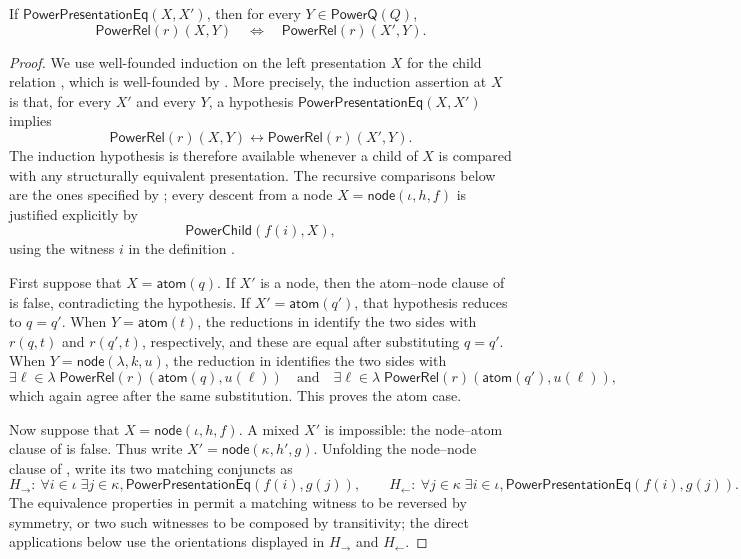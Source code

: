 \begin{lemma}
If $\mathsf{PowerPresentationEq}(X,X')$, then for every
$Y\in\mathsf{PowerQ}(Q)$,
\[
\mathsf{PowerRel}(r)(X,Y)\quad\Longleftrightarrow\quad
\mathsf{PowerRel}(r)(X',Y).
\]
\end{lemma}
\begin{proof}
We use well-founded induction on the left presentation $X$ for the child
relation , which is well-founded by
.  More precisely, the induction assertion at
$X$ is that, for every $X'$ and every $Y$, a hypothesis
$\mathsf{PowerPresentationEq}(X,X')$ implies
\[
 \mathsf{PowerRel}(r)(X,Y)\longleftrightarrow
 \mathsf{PowerRel}(r)(X',Y).
\]
The induction hypothesis is therefore available whenever a child of $X$ is
compared with any structurally equivalent presentation.  The recursive
comparisons below are the ones specified by ; every descent
from a node $X=\mathsf{node}(\iota,h,f)$ is justified explicitly by
\[
 \mathsf{PowerChild}(f(i),X),
\]
using the witness $i$ in the definition .

First suppose that $X=\mathsf{atom}(q)$.  If $X'$ is a node, then the
atom--node clause of  is false, contradicting
the hypothesis.  If $X'=\mathsf{atom}(q')$, that hypothesis reduces to
$q=q'$.  When $Y=\mathsf{atom}(t)$, the reductions in
 identify the two sides with $r(q,t)$ and
$r(q',t)$, respectively, and these are equal after substituting $q=q'$.
When $Y=\mathsf{node}(\lambda,k,u)$, the reduction in
 identifies the two sides with
\[
 \exists \ell\in\lambda\;\mathsf{PowerRel}(r)(\mathsf{atom}(q),u(\ell))
 \quad\text{and}\quad
 \exists \ell\in\lambda\;\mathsf{PowerRel}(r)(\mathsf{atom}(q'),u(\ell)),
\]
which again agree after the same substitution.  This proves the atom case.

Now suppose that $X=\mathsf{node}(\iota,h,f)$.  A mixed $X'$ is impossible:
the node--atom clause of  is false.  Thus write
$X'=\mathsf{node}(\kappa,h',g)$.  Unfolding the node--node clause of
, write its two matching conjuncts as
\[
 H_{\to}:\ \forall i\in\iota\;\exists j\in\kappa,
   \mathsf{PowerPresentationEq}(f(i),g(j)),
 \qquad
 H_{\leftarrow}:\ \forall j\in\kappa\;\exists i\in\iota,
   \mathsf{PowerPresentationEq}(f(i),g(j)).
\]
The equivalence properties in 
permit a matching witness to be reversed by symmetry, or two such witnesses
to be composed by transitivity; the direct applications below use the
orientations displayed in $H_{\to}$ and $H_{\leftarrow}$.


\end{proof}
